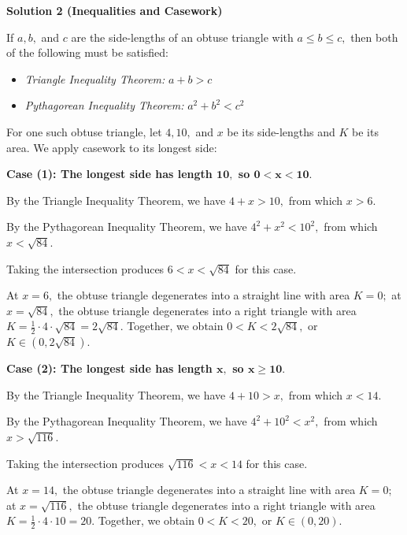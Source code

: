 \begin{enumerate}
 



\textbf{Solution 2 (Inequalities and Casework)}

If $a,b,$ and $c$ are the side-lengths of an obtuse triangle with $a\leq b\leq c,$ then both of the following must be satisfied:

 
            \begin{itemize}
        \item \textit{Triangle Inequality Theorem:} $a+b>c$
            \end{itemize}
            
            \begin{itemize}
        \item \textit{Pythagorean Inequality Theorem:} $a^2+b^2<c^2$
            \end{itemize}
            For one such obtuse triangle, let $4,10,$ and $x$ be its side-lengths and $K$ be its area. We apply casework to its longest side:

 \textbf{Case (1): The longest side has length $\boldsymbol{10,}$ so $\boldsymbol{0<x<10.}$}

 By the Triangle Inequality Theorem, we have $4+x>10,$ from which $x>6.$

 By the Pythagorean Inequality Theorem, we have $4^2+x^2<10^2,$ from which $x<\sqrt{84}.$

 Taking the intersection produces $6<x<\sqrt{84}$ for this case.

 At $x=6,$ the obtuse triangle degenerates into a straight line with area $K=0;$ at $x=\sqrt{84},$ the obtuse triangle degenerates into a right triangle with area $K=\frac12\cdot4\cdot\sqrt{84}=2\sqrt{84}.$ Together, we obtain $0<K<2\sqrt{84},$ or $K\in\left(0,2\sqrt{84}\right).$

 \textbf{Case (2): The longest side has length $\boldsymbol{x,}$ so $\boldsymbol{x\geq10.}$}

 By the Triangle Inequality Theorem, we have $4+10>x,$ from which $x<14.$

 By the Pythagorean Inequality Theorem, we have $4^2+10^2<x^2,$ from which $x>\sqrt{116}.$

 Taking the intersection produces $\sqrt{116}<x<14$ for this case.

 At $x=14,$ the obtuse triangle degenerates into a straight line with area $K=0;$ at $x=\sqrt{116},$ the obtuse triangle degenerates into a right triangle with area $K=\frac12\cdot4\cdot10=20.$ Together, we obtain $0<K<20,$ or $K\in\left(0,20\right).$


\end{enumerate}

